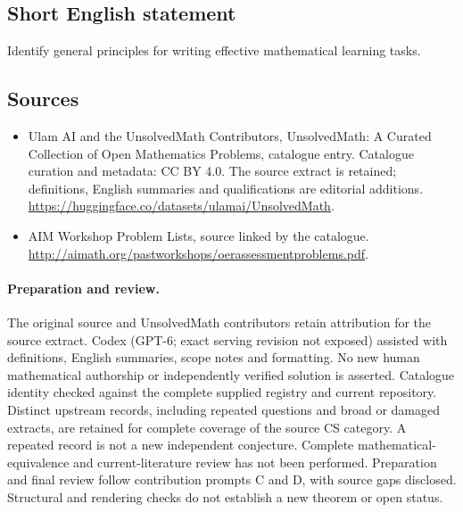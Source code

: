 \documentclass[11pt]{article}
\begin{document}
\subsection{Short English statement}
Identify general principles for writing effective mathematical learning tasks.
\subsection{Sources}
\begin{itemize}
\item[\hypertarget{source:statement:1}{S1}] Ulam AI and the UnsolvedMath Contributors, UnsolvedMath: A Curated Collection of Open Mathematics Problems, catalogue entry. Catalogue curation and metadata: CC BY 4.0. The source extract is retained; definitions, English summaries and qualifications are editorial additions.
\url{https://huggingface.co/datasets/ulamai/UnsolvedMath}.
\item[\hypertarget{source:statement:2}{S2}] AIM Workshop Problem Lists, source linked by the catalogue.
\url{http://aimath.org/pastworkshops/oerassessmentproblems.pdf}.
\end{itemize}
\paragraph{Preparation and review.}
The original source and UnsolvedMath contributors retain attribution for the source extract. Codex (GPT-6; exact serving revision not exposed) assisted with definitions, English summaries, scope notes and formatting. No new human mathematical authorship or independently verified solution is asserted. Catalogue identity checked against the complete supplied registry and current repository. Distinct upstream records, including repeated questions and broad or damaged extracts, are retained for complete coverage of the source CS category. A repeated record is not a new independent conjecture. Complete mathematical-equivalence and current-literature review has not been performed. Preparation and final review follow contribution prompts C and D, with source gaps disclosed. Structural and rendering checks do not establish a new theorem or open status.
\label{end:statement}
\end{document}
